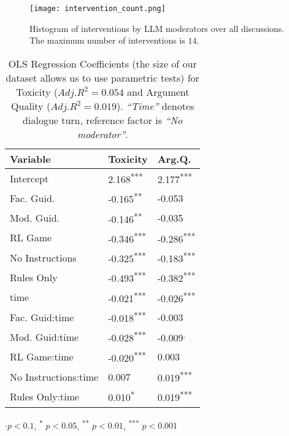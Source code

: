 \begin{figure}
	\centering
	\texttt{[image: intervention\_count.png]}
	\caption{Histogram of interventions by LLM moderators over all discussions. The maximum number of interventions is $14$.}
	\label{fig::intervention_count}
\end{figure}

\begin{table}[htbp]
    \centering
    \begin{tabular}{lll}
        \toprule
        \textbf{Variable} & \textbf{Toxicity} & \textbf{Arg.Q.} \\
        \midrule
        Intercept & 2.168\textsuperscript{***} & 2.177\textsuperscript{***} \\
        Fac. Guid. & -0.165\textsuperscript{**} & -0.053 \\
        Mod. Guid. & -0.146\textsuperscript{**} & -0.035 \\
        \ac{RL} Game & -0.346\textsuperscript{***} & -0.286\textsuperscript{***} \\
        No Instructions & -0.325\textsuperscript{***} & -0.183\textsuperscript{***} \\
        Rules Only & -0.493\textsuperscript{***} & -0.382\textsuperscript{***} \\
        time & -0.021\textsuperscript{***} & -0.026\textsuperscript{***} \\
        Fac. Guid:time & -0.018\textsuperscript{***} & -0.003 \\
        Mod. Guid:time & -0.028\textsuperscript{***} & -0.009\textsuperscript{.} \\
        \ac{RL} Game:time & -0.020\textsuperscript{***} & 0.003 \\
        No Instructions:time & 0.007 & 0.019\textsuperscript{***} \\
        Rules Only:time & 0.010\textsuperscript{*} & 0.019\textsuperscript{***} \\
        \bottomrule
    \end{tabular}
    \small
    $\cdot p<0.1$, \textsuperscript{*} $p<0.05$, \textsuperscript{**} $p<0.01$, \textsuperscript{***} $p<0.001$
    \normalsize
    \caption{OLS Regression Coefficients (the size of our dataset allows us to use parametric tests) for Toxicity ($Adj. R^2=0.054$ and Argument Quality ($Adj. R^2=0.019$). \textit{“Time”} denotes dialogue turn, reference factor is \textit{“No moderator”}.}
    \label{tab:timeseries}
\end{table}


